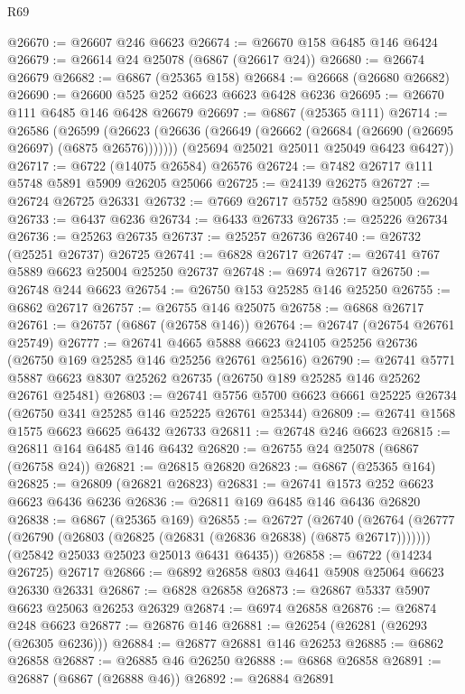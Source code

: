 \begin{lexlean}{R69}
\begin{coremodule}
{@26670 := @26607 @246 @6623
@26674 := @26670 @158 @6485 @146 @6424
@26679 := @26614 @24 @25078 (@6867 (@26617 @24))
@26680 := @26674 @26679
@26682 := @6867 (@25365 @158)
@26684 := @26668 (@26680 @26682)
@26690 := @26600 @525 @252 @6623 @6623 @6428 @6236
@26695 := @26670 @111 @6485 @146 @6428 @26679
@26697 := @6867 (@25365 @111)
@26714 := @26586
    (@26599
      (@26623 (@26636 (@26649 (@26662 (@26684 (@26690 (@26695 @26697) (@6875 @26576)))))))
      (@25694 @25021 @25011 @25049 @6423 @6427))
@26717 := @6722 (@14075 @26584) @26576
@26724 := @7482 @26717 @111 @5748 @5891 @5909 @26205 @25066
@26725 := @24139 @26275
@26727 := @26724 @26725 @26331
@26732 := @7669 @26717 @5752 @5890 @25005 @26204
@26733 := @6437 @6236
@26734 := @6433 @26733
@26735 := @25226 @26734
@26736 := @25263 @26735
@26737 := @25257 @26736
@26740 := @26732 (@25251 @26737) @26725
@26741 := @6828 @26717
@26747 := @26741 @767 @5889 @6623 @25004 @25250 @26737
@26748 := @6974 @26717
@26750 := @26748 @244 @6623
@26754 := @26750 @153 @25285 @146 @25250
@26755 := @6862 @26717
@26757 := @26755 @146 @25075
@26758 := @6868 @26717
@26761 := @26757 (@6867 (@26758 @146))
@26764 := @26747 (@26754 @26761 @25749)
@26777 := @26741
    @4665
    @5888
    @6623
    @24105
    @25256
    @26736
    (@26750 @169 @25285 @146 @25256 @26761 @25616)
@26790 := @26741
    @5771
    @5887
    @6623
    @8307
    @25262
    @26735
    (@26750 @189 @25285 @146 @25262 @26761 @25481)
@26803 := @26741
    @5756
    @5700
    @6623
    @6661
    @25225
    @26734
    (@26750 @341 @25285 @146 @25225 @26761 @25344)
@26809 := @26741 @1568 @1575 @6623 @6625 @6432 @26733
@26811 := @26748 @246 @6623
@26815 := @26811 @164 @6485 @146 @6432
@26820 := @26755 @24 @25078 (@6867 (@26758 @24))
@26821 := @26815 @26820
@26823 := @6867 (@25365 @164)
@26825 := @26809 (@26821 @26823)
@26831 := @26741 @1573 @252 @6623 @6623 @6436 @6236
@26836 := @26811 @169 @6485 @146 @6436 @26820
@26838 := @6867 (@25365 @169)
@26855 := @26727
    (@26740
      (@26764 (@26777 (@26790 (@26803 (@26825 (@26831 (@26836 @26838) (@6875 @26717)))))))
      (@25842 @25033 @25023 @25013 @6431 @6435))
@26858 := @6722 (@14234 @26725) @26717
@26866 := @6892 @26858 @803 @4641 @5908 @25064 @6623 @26330 @26331
@26867 := @6828 @26858
@26873 := @26867 @5337 @5907 @6623 @25063 @26253 @26329
@26874 := @6974 @26858
@26876 := @26874 @248 @6623
@26877 := @26876 @146
@26881 := @26254 (@26281 (@26293 (@26305 @6236)))
@26884 := @26877 @26881 @146 @26253
@26885 := @6862 @26858
@26887 := @26885 @46 @26250
@26888 := @6868 @26858
@26891 := @26887 (@6867 (@26888 @46))
@26892 := @26884 @26891
}
\end{coremodule}
\end{lexlean}
